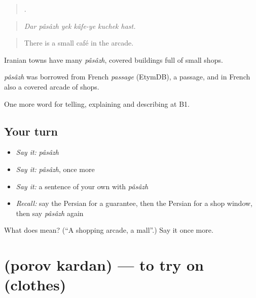 \begin{quote}
     .
\end{quote}

\begin{quote}
\emph{Dar pâsâzh yek kâfe-ye kuchek hast.}
\end{quote}

\begin{quote}
There is a small café in the arcade.
\end{quote}

Iranian towns have many \emph{pâsâzh}, covered buildings full of small shops.

\begin{cousinweb}
\emph{pâsâzh} was borrowed from French \emph{passage} (EtymDB), a passage, and in French also a covered arcade of shops.
\end{cousinweb}

\begin{grammarlens}[title={What you've built}]
One more word for telling, explaining and describing at B1.
\end{grammarlens}

\subsection*{Your turn}
\begin{itemize}
\raggedright
  \item \emph{Say it:} \emph{pâsâzh}
  \item \emph{Say it:} \emph{pâsâzh}, once more
  \item \emph{Say it:} a sentence of your own with \emph{pâsâzh}
  \item \emph{Recall:} say the Persian for a guarantee, then the Persian for a shop window, then say \emph{pâsâzh} again
\end{itemize}

\begin{tcolorbox}[breakable,colback=teal!4,colframe=teal!35!black,title={Before you move on}]
What does  mean? (\textquotedblleft{}A shopping arcade, a mall\textquotedblright{}.) Say it once more.
\end{tcolorbox}
\section[\texorpdfstring{\fa{پرو} \fa{کردن} (porov kardan)}{پرو کردن (porov kardan)}]{  (porov kardan) — to try on (clothes)}


